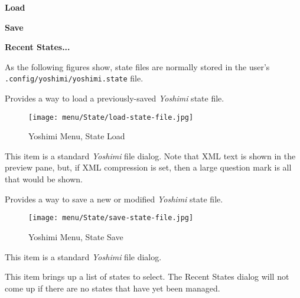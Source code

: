    \begin{enumber}
      \item \textbf{Load}
      \item \textbf{Save}
      \item \textbf{Recent States...}
   \end{enumber}

   As the following figures show, state files are normally stored in the
   user's \texttt{.config/yoshimi/yoshimi.state} file.

   \setcounter{ItemCounter}{0}      %

   Provides a way to load a previously-saved \textsl{Yoshimi} state file.

\begin{figure}[H]
   \centering 
   \texttt{[image: menu/State/load-state-file.jpg]}
   \caption{Yoshimi Menu, State Load}
   \label{fig:yoshimi_menu_state_load}
\end{figure}

   This item is a standard \textsl{Yoshimi} file dialog.
   Note that XML text is shown in the preview pane, but, if XML compression is
   set, then a large question mark is all that would be shown.

   Provides a way to save a new or modified \textsl{Yoshimi} state file.

\begin{figure}[H]
   \centering 
   \texttt{[image: menu/State/save-state-file.jpg]}
   \caption{Yoshimi Menu, State Save}
   \label{fig:yoshimi_menu_state_save}
\end{figure}

   This item is a standard \textsl{Yoshimi} file dialog.

   This item brings up a list of states to select.
   The Recent States dialog will not come up if there are no states that have
   yet been managed.

